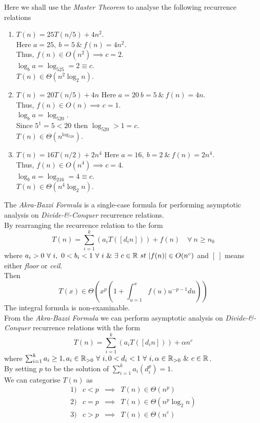 \documentclass[11pt,a4paper]{article}
\begin{document}
Here we shall use the \textit{Master Theorem} to analyse the following recurrence relations
\begin{enumerate}[label=\roman*)]
	\item $T(n)=25T(n/5)+4n^2$.\\
	Here $a=25,\ b=5\ \&\ f(n)=4n^2$.\\
	Thus, $f(n)\in O(n^2)\implies c=2$.\\
	$\log_ba=\log_525=2\equiv c$.\\
	$T(n)\in \Theta(n^2\log_2n)$.
	
	\item $T(n)=20T(n/5)+4n$
	Here $a=20\ b=5\ \&\ f(n)=4n$.\\
	Thus, $f(n)\in O(n)\implies c=1$.\\
	$\log_ba=\log_520$.\\
	Since $5^1=5<20$ then $\log_520>1=c$.\\
	$T(n)\in \Theta(n^{\log_520})$.
	
	\item $T(n)=16T(n/2)+2n^4$
	Here $a=16,\ b=2\ \&\ f(n)=2n^4$.\\
	Thus, $f(n)\in O(n^4)\implies c=4$.\\
	$\log_ba=\log_216=4\equiv c$.\\
	$T(n)\in \Theta(n^4\log_2n)$.
\end{enumerate}

The \textit{Akra-Bazzi Formula} is a single-case formula for performing asymptotic analysis on \textit{Divide-\&-Conquer} recurrence relations.\\
By rearranging the recurrence relation to the form
$$T(n)=\sum_{i=1}^k \left(a_iT\left(\left[d_in\right]\right)\right)+f(n)\quad\forall\ n\geq n_0$$
where $a_i>0\ \forall\ i,\ 0<b_i<1\ \forall\ i\ \&\ \exists\ c\in\real\ st\ |f(n)|\in O(n^c)$ and $[\ ]$ means either \textit{floor} or \textit{ceil}.\\
Then
$$T(x)\in\Theta\left(x^p\left(1+\int_{u=1}^x f(u) u^{-p-1}du\right)\right)$$
\nb The integral formula is non-examinable.\\

From the \textit{Akra-Bazzi Formula} we can perform asymptotic analysis on \textit{Divide-\&-Conquer} recurrence relations with the form
$$T(n) = \sum_{i=1}^k \left(a_iT([d_in])\right)+\alpha n^c$$
where $\sum_{i=1}^k a_i\geq1, a_i\in\mathbb{R}_{>0}\ \forall\ i, 0<d_i<1\ \forall\ i, \alpha\in\mathbb{R}_{>0}\ \&\ c\in\mathbb{R}$.\\
By setting $p$ to be the solution of $\sum_{i=1}^ka_i(d_i^p)=1$.\\
We can categorise $T(n)$ as
\[\begin{array}{rrcl}
1)&c<p &\implies& T(n) \in\Theta(n^p)\\
2)&c=p &\implies& T(n) \in\Theta(n^p\log_2n)\\
3)&c>p &\implies& T(n) \in\Theta(n^c)
\end{array}\]
\end{document}
